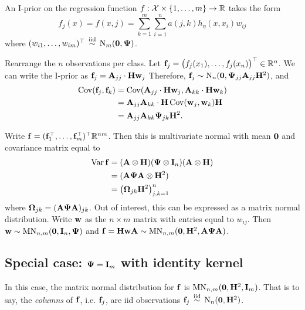 An I-prior on the regression function $f:{\mathcal X} \times \{1,\dots,m\} \to \mathbb{R}$ takes the form
\[
  f_j(x) = f(x,j) = \sum_{k=1}^m\sum_{i=1}^n a(j,k)h_\eta(x,x_i) w_{ij}
\]
where $(w_{i1},\dots,w_{im})^\top \,\overset{\text{iid}}{\sim}\, \operatorname{N}_m({\mathbf 0},{\bm\Psi})$.


Rearrange the $n$ observations per class.
Let ${\mathbf f}_j = \big(f_j(x_1),\dots,f_j(x_n)\big)^\top \in \mathbb{R}^n$.
We can write the I-prior as ${\mathbf f}_j = {\mathbf A}_{jj} \cdot {\mathbf H}{\mathbf w}_j$
Therefore, ${\mathbf f}_j \sim \operatorname{N}_n({\mathbf 0}, {\bm\Psi}_{jj}{\mathbf A}_{jj} {\mathbf H}^2)$, and
\begin{align*}
  \operatorname{Cov}({\mathbf f}_j,{\mathbf f}_k) &= \operatorname{Cov}({\mathbf A}_{jj} \cdot {\mathbf H}{\mathbf w}_j, {\mathbf A}_{kk} \cdot {\mathbf H}{\mathbf w}_k) \\
  &= {\mathbf A}_{jj}{\mathbf A}_{kk} \cdot {\mathbf H} \operatorname{Cov}({\mathbf w}_j,{\mathbf w}_k) {\mathbf H} \\
  &= {\mathbf A}_{jj}{\mathbf A}_{kk}{\bm\Psi}_{jk} {\mathbf H}^2.
\end{align*}

Write ${\mathbf f} = ({\mathbf f}_1^\top, \dots, {\mathbf f}_m^\top)^\top \mathbb{R}^{nm}$.
Then this is multivariate normal with mean ${\mathbf 0}$ and covariance matrix equal to
\begin{align*}
  \operatorname{Var} {\mathbf f} &= ({\mathbf A} \otimes {\mathbf H}) ({\bm\Psi} \otimes {\mathbf I}_n) ({\mathbf A} \otimes {\mathbf H}) \\
  &= ({\mathbf A}{\bm\Psi}{\mathbf A} \otimes {\mathbf H}^2) \\
  &= \big({\bm\Omega}_{jk}{\mathbf H}^2\big)_{j,k=1}^n
\end{align*}
where ${\bm\Omega}_{jk} = ({\mathbf A}{\bm\Psi}{\mathbf A})_{jk}$. 
Out of interest, this can be expressed as a matrix normal distribution.
Write ${\mathbf w}$ as the $n \times m$ matrix with entries equal to $w_{ij}$.
Then ${\mathbf w} \sim \operatorname{MN}_{n,m}({\mathbf 0},{\mathbf I}_n,{\bm\Psi})$ and ${\mathbf f} = {\mathbf H}{\mathbf w}{\mathbf A} \sim \operatorname{MN}_{n,m}({\mathbf 0},{\mathbf H}^2,{\mathbf A}{\bm\Psi}{\mathbf A})$.

\subsection[Special case: Psi = I with identity kernel]{Special case: ${\bm\Psi} = {\mathbf I}_m$ with identity kernel}

In this case, the matrix normal distribution for ${\mathbf f}$ is $\operatorname{MN}_{n,m}({\mathbf 0},{\mathbf H}^2,{\mathbf I}_m)$. 
That is to say, the \emph{columns} of ${\mathbf f}$, i.e. ${\mathbf f}_j$, are iid observations ${\mathbf f}_j \,\overset{\text{iid}}{\sim}\, \operatorname{N}_n({\mathbf 0},{\mathbf H}^2)$.
































